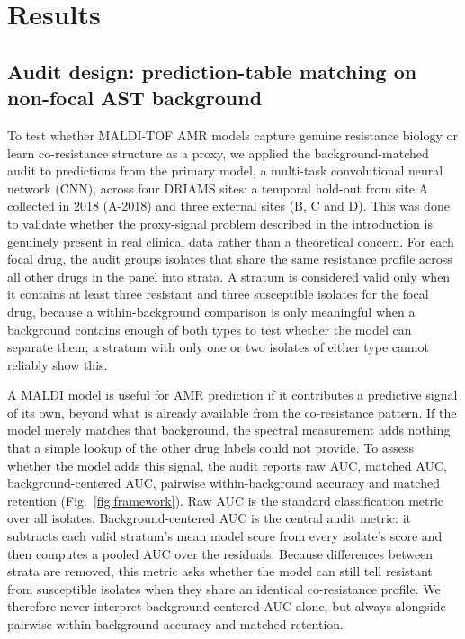 \documentclass[11pt]{article}
\begin{document}
\section*{Results}

\subsection*{Audit design: prediction-table matching on non-focal AST background}

To test whether MALDI-TOF AMR models capture genuine resistance biology or learn co-resistance structure as a proxy, we applied the background-matched audit to predictions from the primary model, a multi-task convolutional neural network (CNN), across four DRIAMS sites: a temporal hold-out from site A collected in 2018 (A-2018) and three external sites (B, C and D). This was done to validate whether the proxy-signal problem described in the introduction is genuinely present in real clinical data rather than a theoretical concern. For each focal drug, the audit groups isolates that share the same resistance profile across all other drugs in the panel into strata. A stratum is considered valid only when it contains at least three resistant and three susceptible isolates for the focal drug, because a within-background comparison is only meaningful when a background contains enough of both types to test whether the model can separate them; a stratum with only one or two isolates of either type cannot reliably show this.

A MALDI model is useful for AMR prediction if it contributes a predictive signal of its own, beyond what is already available from the co-resistance pattern. If the model merely matches that background, the spectral measurement adds nothing that a simple lookup of the other drug labels could not provide. To assess whether the model adds this signal, the audit reports raw AUC, matched AUC, background-centered AUC, pairwise within-background accuracy and matched retention (Fig.~\ref{fig:framework}). Raw AUC is the standard classification metric over all isolates. Background-centered AUC is the central audit metric: it subtracts each valid stratum's mean model score from every isolate's score and then computes a pooled AUC over the residuals. Because differences between strata are removed, this metric asks whether the model can still tell resistant from susceptible isolates when they share an identical co-resistance profile. We therefore never interpret background-centered AUC alone, but always alongside pairwise within-background accuracy and matched retention.
\end{document}
